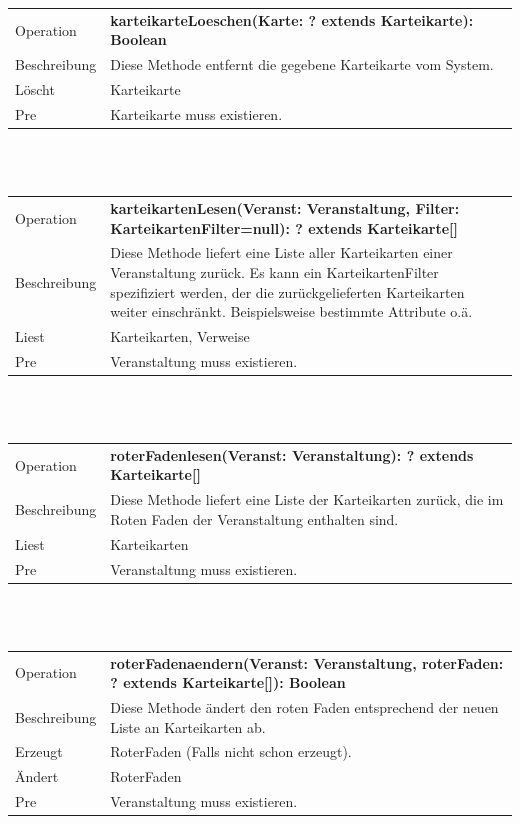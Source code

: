 \documentclass[12pt,a4paper]{article}
\begin{document}
{\begin{tabular}{|l|p{12cm}|}
	\hline
	Operation & \textbf{ karteikarteLoeschen(Karte: ? extends Karteikarte): Boolean }\\ 
	Beschreibung & Diese Methode entfernt die gegebene Karteikarte vom System.\\ 
	Löscht & Karteikarte \\ 
	Pre & Karteikarte muss existieren. \\ 
	\hline 
\end{tabular} \\\\

\begin{tabular}{|l|p{12cm}|}
	\hline
	Operation &  \textbf{karteikartenLesen(Veranst: Veranstaltung, Filter: KarteikartenFilter=null): ? extends Karteikarte[]} \\ 
	Beschreibung & Diese Methode liefert eine Liste aller Karteikarten einer Veranstaltung zurück. Es kann ein KarteikartenFilter spezifiziert werden, der die zurückgelieferten Karteikarten weiter einschränkt. Beispielsweise bestimmte Attribute o.ä.\\ 
	Liest & Karteikarten, Verweise \\ 
	Pre & Veranstaltung muss existieren. \\ 
	\hline 
\end{tabular} \\\\

\begin{tabular}{|l|p{12cm}|}
	\hline
	Operation &  \textbf{roterFadenlesen(Veranst: Veranstaltung): ? extends Karteikarte[]} \\ 
	Beschreibung & Diese Methode liefert eine Liste der Karteikarten zurück, die im Roten Faden der Veranstaltung enthalten sind.\\ 
	Liest & Karteikarten \\ 
	Pre & Veranstaltung muss existieren. \\ 
	\hline 
\end{tabular} \\\\

\begin{tabular}{|l|p{12cm}|}
	\hline
	Operation &  \textbf{roterFadenaendern(Veranst: Veranstaltung, roterFaden: ? extends Karteikarte[]): Boolean} \\ 
	Beschreibung & Diese Methode ändert den roten Faden entsprechend der neuen Liste an Karteikarten ab.\\ 
	Erzeugt & RoterFaden (Falls nicht schon erzeugt). \\ 
	Ändert & RoterFaden \\ 
	Pre & Veranstaltung muss existieren. \\ 
	\hline 
\end{tabular} \\\\

}
\end{document}
